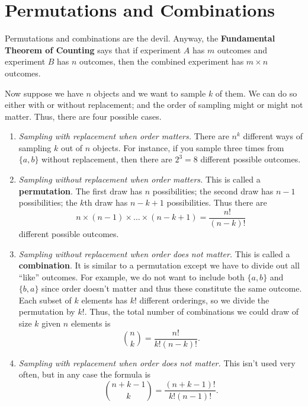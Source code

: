 \documentclass[12pt]{article}
\theoremstyle{definition}
\begin{document}
\section{Permutations and Combinations}

Permutations and combinations are the devil. Anyway, the \textbf{Fundamental Theorem of Counting} says that if experiment $A$ has $m$ outcomes and experiment $B$ has $n$ outcomes, then the combined experiment has $m \times n$ outcomes.

Now suppose we have $n$ objects and we want to sample $k$ of them. We can do so either with or without replacement; and the order of sampling might or might not matter. Thus, there are four possible cases.  

\begin{enumerate}
	\item \emph{Sampling with replacement when order matters.} There are $n^k$ different ways of sampling $k$ out of $n$ objects. For instance, if you sample three times from $\{a, b\}$ without replacement, then there are $2^3=8$ different possible outcomes. 

	\item \emph{Sampling without replacement when order matters.} This is called a \textbf{permutation}. The first draw has $n$ possibilities; the second draw has $n-1$ possibilities; the $k$th draw has $n-k+1$ possibilities. Thus there are
	\[n \times (n-1) \times \hdots \times (n-k+1) = \frac{n!}{(n-k)!}	\]	
different possible outcomes. 

	\item \emph{Sampling without replacement when order does not matter.} This is called a \textbf{combination}. It is similar to a permutation except we have to divide out all ``like'' outcomes. For example, we do not want to include both $\{a,b\}$ and $\{b,a\}$ since order doesn't matter and thus these constitute the same outcome. Each subset of $k$ elements has $k!$ different orderings, so we divide the permutation by $k!$. Thus, the total number of combinations we could draw of size $k$ given $n$ elements is
		\[\binom{n}{k} = \frac{n!}{k!(n-k)!}.	\]
		
	\item \emph{Sampling with replacement when order does not matter.} This isn't used very often, but in any case the formula is
		\[\binom{n+k-1}{k} = \frac{(n + k - 1)!}{k!(n-1)!}.	\]
\end{enumerate}



	
\end{document}
